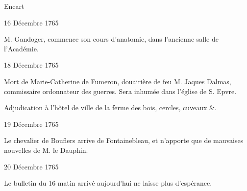 \begin{diary}{Encart}{}
                           \end{diary}


                     \begin{diary}{16 Décembre 1765}{}


                           M. Gandoger, commence son cours
                           d'anatomie, dans l'ancienne salle
                              de
                              l'Académie. \bigskip


                     \end{diary}

                     \begin{diary}{18 Décembre 1765}{}

                         Mort de Marie-Catherine de Fumeron,
                           douairière de feu M. Jaques Dalmas,
                           commissaire ordonnateur des guerres. Sera
                           inhumée dans l’église de S.
                              Epvre. \bigskip



                           Adjudication à l'hôtel de ville de
                           la ferme
                           des bois, cercles, cuveaux \&. \bigskip


                     \end{diary}

                     \begin{diary}{19 Décembre 1765}{}


                           Le chevalier de Bouflers arrive de Fontainebleau,
                           et n'apporte que de mauvaises nouvelles
                           de M. le Dauphin. \bigskip


                     \end{diary}

                     \begin{diary}{20 Décembre 1765}{}

                         Le bulletin du 16
                              matin arrivé
                           aujourd'hui ne laisse plus d'espérance. \bigskip


                     \end{diary}

